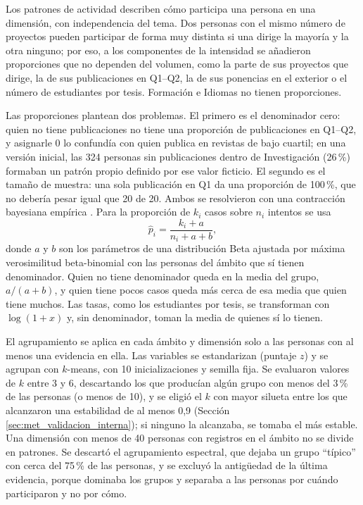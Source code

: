 Los patrones de actividad describen cómo participa una persona en una dimensión, con independencia del tema. Dos personas con el mismo número de proyectos pueden participar de forma muy distinta si una dirige la mayoría y la otra ninguno; por eso, a los componentes de la intensidad se añadieron proporciones que no dependen del volumen, como la parte de sus proyectos que dirige, la de sus publicaciones en Q1--Q2, la de sus ponencias en el exterior o el número de estudiantes por tesis. Formación e Idiomas no tienen proporciones.

Las proporciones plantean dos problemas. El primero es el denominador cero: quien no tiene publicaciones no tiene una proporción de publicaciones en Q1--Q2, y asignarle 0 lo confundía con quien publica en revistas de bajo cuartil; en una versión inicial, las 324 personas sin publicaciones dentro de Investigación (26\,\%) formaban un patrón propio definido por ese valor ficticio. El segundo es el tamaño de muestra: una sola publicación en Q1 da una proporción de 100\,\%, que no debería pesar igual que 20 de 20. Ambos se resolvieron con una contracción bayesiana empírica \parencite{Casella1985}. Para la proporción de $k_i$ casos sobre $n_i$ intentos se usa
\begin{equation}
    \hat{p}_i = \frac{k_i + a}{n_i + a + b},
    \label{eq:betabinomial}
\end{equation}
donde $a$ y $b$ son los parámetros de una distribución Beta ajustada por máxima verosimilitud beta-binomial con las personas del ámbito que sí tienen denominador. Quien no tiene denominador queda en la media del grupo, $a/(a+b)$, y quien tiene pocos casos queda más cerca de esa media que quien tiene muchos. Las tasas, como los estudiantes por tesis, se transforman con $\log(1+x)$ y, sin denominador, toman la media de quienes sí lo tienen.

El agrupamiento se aplica en cada ámbito y dimensión solo a las personas con al menos una evidencia en ella. Las variables se estandarizan (puntaje $z$) y se agrupan con $k$-means, con 10 inicializaciones y semilla fija. Se evaluaron valores de $k$ entre 3 y 6, descartando los que producían algún grupo con menos del 3\,\% de las personas (o menos de 10), y se eligió el $k$ con mayor silueta entre los que alcanzaron una estabilidad de al menos 0,9 (Sección \ref{sec:met_validacion_interna}); si ninguno la alcanzaba, se tomaba el más estable. Una dimensión con menos de 40 personas con registros en el ámbito no se divide en patrones. Se descartó el agrupamiento espectral, que dejaba un grupo ``típico'' con cerca del 75\,\% de las personas, y se excluyó la antigüedad de la última evidencia, porque dominaba los grupos y separaba a las personas por cuándo participaron y no por cómo.


